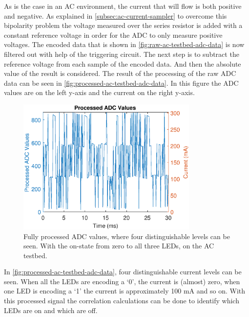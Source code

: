 As is the case in an AC environment, the current that will flow is both positive and negative.
As explained in \autoref{subsec:ac-current-sampler} to overcome this bipolarity problem the voltage measured over the series resistor is added with a constant reference voltage in order for the ADC to only measure positive voltages.
The encoded data that is shown in \autoref{fig:raw-ac-testbed-adc-data} is now filtered out with help of the triggering circuit.
The next step is to subtract the reference voltage from each sample of the encoded data.
And then the absolute value of the result is considered.
The result of the processing of the raw ADC data can be seen in \autoref{fig:processed-ac-testbed-adc-data}.
In this figure the ADC values are on the left y-axis and the current on the right y-axis.

\begin{figure}[ht]
  \centering
  \includegraphics[width=0.8\textwidth]{chapters/evaluation-chapters/hardware/ac/processed-ac-testbed-adc-data.eps}
    \caption{Fully processed ADC values, where four distinguishable levels can be seen. With the on-state from zero to all three LEDs, on the AC testbed.}
  \label{fig:processed-ac-testbed-adc-data}
\end{figure}

In \autoref{fig:processed-ac-testbed-adc-data}, four distinguishable current levels can be seen.
When all the LEDs are encoding a `0', the current is (almost) zero, when one LED is encoding a `1' the current is approximately 100 mA and so on.
With this processed signal the correlation calculations can be done to identify which LEDs are on and which are off.




